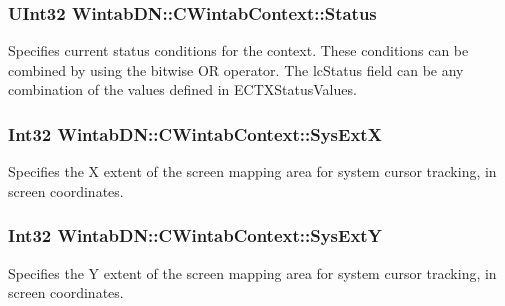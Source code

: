 \hypertarget{class_wintab_d_n_1_1_c_wintab_context_a438ab3e5e62042fd6aa2f57cee4509c6}{
\subsubsection[{Status}]{\setlength{\rightskip}{0pt plus 5cm}UInt32 WintabDN::CWintabContext::Status}}
\label{class_wintab_d_n_1_1_c_wintab_context_a438ab3e5e62042fd6aa2f57cee4509c6}


Specifies current status conditions for the context. These conditions can be combined by using the bitwise OR operator. The lcStatus field can be any combination of the values defined in ECTXStatusValues. 

\hypertarget{class_wintab_d_n_1_1_c_wintab_context_a787e9ded767494fef4fd2647fe4842dd}{
\subsubsection[{SysExtX}]{\setlength{\rightskip}{0pt plus 5cm}Int32 WintabDN::CWintabContext::SysExtX}}
\label{class_wintab_d_n_1_1_c_wintab_context_a787e9ded767494fef4fd2647fe4842dd}


Specifies the X extent of the screen mapping area for system cursor tracking, in screen coordinates. 

\hypertarget{class_wintab_d_n_1_1_c_wintab_context_a832a9049ba42d0728ce72c5af9786781}{
\subsubsection[{SysExtY}]{\setlength{\rightskip}{0pt plus 5cm}Int32 WintabDN::CWintabContext::SysExtY}}
\label{class_wintab_d_n_1_1_c_wintab_context_a832a9049ba42d0728ce72c5af9786781}


Specifies the Y extent of the screen mapping area for system cursor tracking, in screen coordinates. 

